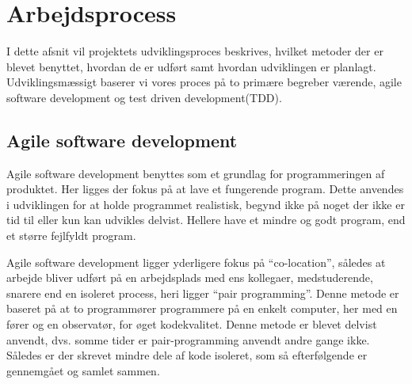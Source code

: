 \chapter{Arbejdsprocess}

I dette afsnit vil projektets udviklingsproces beskrives, hvilket metoder der er blevet benyttet, hvordan de er udført samt hvordan udviklingen er planlagt. Udviklingsmæssigt baserer vi vores proces på to primære begreber værende, agile software development og test driven development(TDD).

\section{Agile software development}
Agile software development benyttes som et grundlag for programmeringen af produktet. 
Her ligges der fokus på at lave et fungerende program.
Dette anvendes i udviklingen for at holde programmet realistisk, begynd ikke på noget der ikke er tid til eller kun kan udvikles delvist. 
Hellere have et mindre og godt program, end et større fejlfyldt program.

Agile software development ligger yderligere fokus på ``co-location'', således at arbejde bliver udført på en arbejdsplads med ens kollegaer, medstuderende, snarere end en isoleret process, heri ligger ``pair programming''. Denne metode er baseret på at to programmører programmere på en enkelt computer, her med en fører og en observatør, for øget kodekvalitet. 
Denne metode er blevet delvist anvendt, dvs. somme tider er pair-programming anvendt andre gange ikke. 
Således er der skrevet mindre dele af kode isoleret, som så efterfølgende er gennemgået og samlet sammen.


